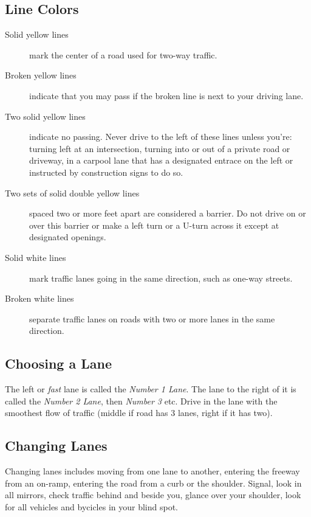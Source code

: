 \subsection{Line Colors}

\begin{description}
\item[Solid yellow lines]
mark the center of a road used for two-way traffic.
\item[Broken yellow lines]
indicate that you may pass if the broken line is next to your driving lane.
\item[Two solid yellow lines]
indicate no passing. Never drive to the left of these lines unless you're:
turning left at an intersection,
turning into or out of a private road or driveway,
in a carpool lane that has a designated entrace on the left
or instructed by construction signs to do so.
\item[Two sets of solid double yellow lines]
spaced two or more feet apart are considered a barrier.
Do not drive on or over this barrier or make a left turn or a U-turn across it
except at designated openings.
\item[Solid white lines] mark traffic lanes going in the same direction,
such as one-way streets.
\item[Broken white lines] separate traffic lanes on roads
with two or more lanes in the same direction.
\end{description}

\subsection{Choosing a Lane}

The left or \emph{fast} lane is called the \emph{Number 1 Lane}.
The lane to the right of it is called the \emph{Number 2 Lane},
then \emph{Number 3} etc.
Drive in the lane with the smoothest flow of traffic
(middle if road has 3 lanes, right if it has two).

\subsection{Changing Lanes}

Changing lanes includes moving from one lane to another,
entering the freeway from an on-ramp,
entering the road from a curb or the shoulder.
Signal, look in all mirrors, check traffic behind and beside you,
glance over your shoulder,
look for all vehicles and bycicles in your blind spot.

